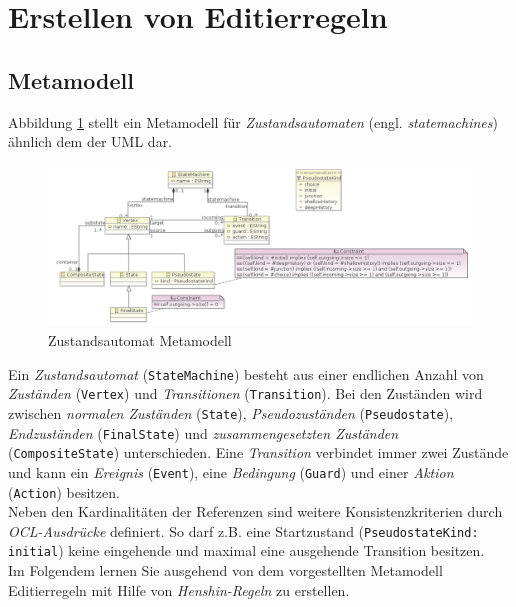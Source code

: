 \section{Erstellen von Editierregeln}
\subsection{Metamodell}\label{subsec:metamodel}
Abbildung \ref{statemachine_metamodel} stellt ein Metamodell für \textit{Zustandsautomaten} (engl. \textit{statemachines}) ähnlich dem der UML dar.

\begin{figure}[H]
\centering
\includegraphics[width=\textwidth]{editrules/graphics/statemachine.png}
\caption{Zustandsautomat Metamodell}
\label{statemachine_metamodel}
\end{figure}

Ein \textit{Zustandsautomat} (\texttt{StateMachine}) besteht aus einer endlichen Anzahl von \textit{Zuständen} (\texttt{Vertex}) und \textit{Transitionen} (\texttt{Transition}).
Bei den Zuständen wird zwischen \textit{normalen Zuständen} (\texttt{State}), \textit{Pseudozuständen} (\texttt{Pseudostate}), \textit{Endzuständen} (\texttt{FinalState}) und \textit{zusammengesetzten Zuständen} (\texttt{CompositeState}) unterschieden.
Eine \textit{Transition} verbindet immer zwei Zustände und  kann ein \textit{Ereignis} (\texttt{Event}),  eine \textit{Bedingung} (\texttt{Guard}) und einer \textit{Aktion} (\texttt{Action}) besitzen.\\
Neben den Kardinalitäten der Referenzen sind weitere Konsistenzkriterien durch \textit{OCL-Ausdrücke} definiert. 
So darf z.B. eine Startzustand (\texttt{PseudostateKind: initial}) keine eingehende und maximal eine ausgehende Transition besitzen.\\
Im Folgendem lernen Sie ausgehend von dem vorgestellten Metamodell Editierregeln mit Hilfe von \textit{Henshin-Regeln} zu erstellen.\\

